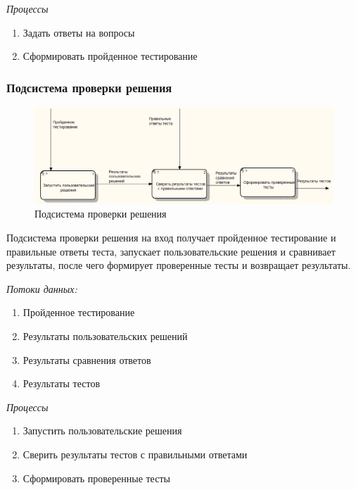 \textit{Процессы}
\begin{enumerate}
    \item Задать ответы на вопросы
    \item Сформировать пройденное тестирование
\end{enumerate}


\subsubsection{Подсистема проверки решения}
\begin{figure}[H]
    \includegraphics[width=\textwidth, center]{../img/dfd/Subsystem_Validator.png}
    \caption{Подсистема проверки решения}
\end{figure}

Подсистема проверки решения на вход получает пройденное тестирование и правильные
ответы теста, запускает пользовательские решения и сравнивает результаты, после
чего формирует проверенные тесты и возвращает результаты.

\textit{Потоки данных:}
\begin{enumerate}
    \item Пройденное тестирование
    \item Результаты пользовательских решений
    \item Результаты сравнения ответов
    \item Результаты тестов
\end{enumerate}

\textit{Процессы}
\begin{enumerate}
    \item Запустить пользовательские решения
    \item Сверить результаты тестов с правильными ответами
    \item Сформировать проверенные тесты
\end{enumerate}